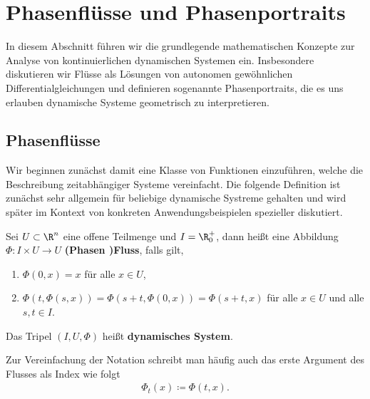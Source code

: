 \documentclass[letterpaper,10pt,english]{jupyterBook}
\begin{document}
\section{Phasenflüsse und Phasenportraits}
\label{\detokenize{ode/fluesse:phasenflusse-und-phasenportraits}}\label{\detokenize{ode/fluesse:s-fluesse}}\label{\detokenize{ode/fluesse::doc}}
\par
In diesem Abschnitt führen wir die grundlegende mathematischen Konzepte zur Analyse von kontinuierlichen dynamischen Systemen ein. Insbesondere diskutieren wir Flüsse als Lösungen von autonomen gewöhnlichen Differentialgleichungen und definieren sogenannte Phasenportraits, die es uns erlauben dynamische Systeme geometrisch zu interpretieren.


\subsection{Phasenflüsse}
\label{\detokenize{ode/fluesse:phasenflusse}}
\par
Wir beginnen zunächst damit eine Klasse von Funktionen einzuführen, welche die Beschreibung zeitabhängiger Systeme vereinfacht.
Die folgende Definition ist zunächst sehr allgemein für beliebige dynamische Systreme gehalten und wird später im Kontext von konkreten Anwendungsbeispielen spezieller diskutiert.
\label{ode/fluesse:def:Fluss}
\begin{definition}{}{}



\par
Sei \(U \subset \R^n\) eine offene Teilmenge und \(I=\R^+_0\), dann heißt eine Abbildung \(\Phi:I\times U\rightarrow U\) \textbf{(Phasen )Fluss}, falls gilt,
\begin{enumerate}

\item {} 
\par
\(\Phi(0, x) = x\) für alle \(x\in U\),

\item {} 
\par
\(\Phi(t, \Phi(s,x)) = \Phi(s + t, \Phi(0, x)) = \Phi(s + t, x)\) für alle \(x\in U\) und alle \(s,t\in I\).

\end{enumerate}

\par
Das Tripel \((I, U, \Phi)\) heißt \textbf{dynamisches System}.

\par
Zur Vereinfachung der Notation schreibt man häufig auch das erste Argument des Flusses als Index wie folgt
\begin{align*}
\Phi_t(x) \coloneqq \Phi(t, x).
\end{align*}\end{definition}
\end{document}
